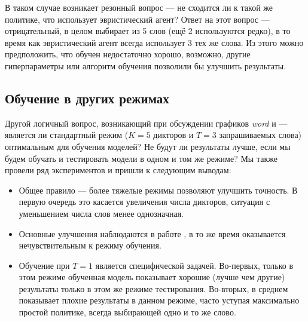 В таком случае возникает резонный вопрос --- не сходится ли \enquirer{}
к такой же политике, что использует эвристический агент? Ответ на этот вопрос ---
отрицательный, в целом \enquirer{} выбирает из 5 слов (ещё 2 используются редко),
в то время как эвристический агент всегда использует 3 тех же слова. Из этого
можно предположить, что \enquirer{} обучен недостаточно хорошо, возможно, другие
гиперпараметры или алгоритм обучения позволили бы улучшить результаты.

\subsection{Обучение в других режимах}

Другой логичный вопрос, возникающий при обсуждении графиков \textit{word} и
 --- является ли стандартный режим ($K = 5$ дикторов и
$T = 3$ запрашиваемых слова) оптимальным для обучения моделей? Не будут ли
результаты лучше, если мы будем обучать и тестировать модели в одном и том же
режиме? Мы также провели ряд экспериментов и пришли к следующим выводам:
\begin{itemize}
    \item Общее правило --- более тяжелые режимы позволяют улучшить точность.
    В первую очередь это касается увеличения числа дикторов, ситуация с
    уменьшением числа слов менее однозначная.
    \item Основные улучшения наблюдаются в работе \guesser{}, в то же время
    \enquirer{} оказывается нечувствительным к режиму обучения.
    \item Обучение при $T = 1$ является специфической задачей. Во-первых,
    только в этом режиме обученная модель показывает хорошие (лучше чем другие)
    результаты только в этом же режиме тестирования. Во-вторых, \enquirer{}
    в среднем показывает плохие результаты в данном режиме, часто уступая
    максимально простой политике, всегда выбирающей одно и то же слово.
\end{itemize}